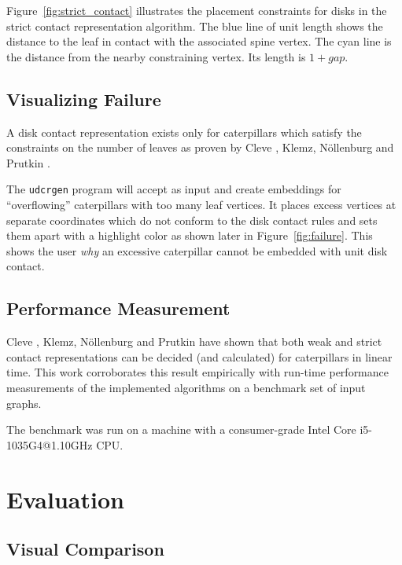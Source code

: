 \documentclass[draft,final]{vutinfth} %
\begin{document}
Figure~\ref{fig:strict_contact} illustrates the placement constraints for disks in the strict contact representation algorithm. The blue line of unit length shows the distance to the leaf in contact with the associated spine vertex. The cyan line is the distance from the nearby constraining vertex. Its length is $1 + gap$.

\section{Visualizing Failure}

A disk contact representation exists only for caterpillars which satisfy the constraints on the number of leaves as proven by Cleve \cite{Cleve2020}, Klemz, Nöllenburg and Prutkin \cite{Klemz2015}.

The \texttt{udcrgen} program will accept as input and create embeddings for ``overflowing'' caterpillars with too many leaf vertices.
It places excess vertices at separate coordinates which do not conform to the disk contact rules and sets them apart with a highlight color as shown later in Figure~\ref{fig:failure}. This shows the user \emph{why} an excessive caterpillar cannot be embedded with unit disk contact.

\section{Performance Measurement}

Cleve \cite{Cleve2020}, Klemz, Nöllenburg and Prutkin \cite{Klemz2015} have shown that both weak and strict contact representations can be decided (and calculated) for caterpillars in linear time. This work corroborates this result empirically with run-time performance measurements of the implemented algorithms on a benchmark set of input graphs.

The benchmark was run on a machine with a consumer-grade Intel Core i5-1035G4@1.10GHz CPU.


\chapter{Evaluation}

\section{Visual Comparison}
\end{document}
